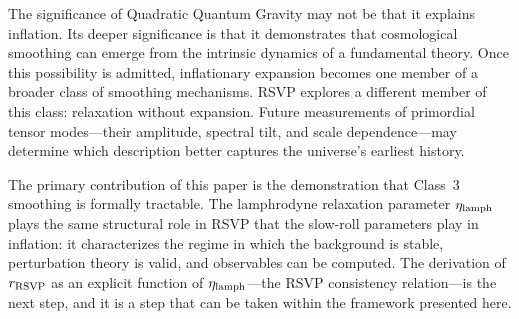 \documentclass[12pt, a4paper]{article}
\newcommand{\etalamph}{\eta_{\rm lamph}}
\newcommand{\rRSVP}{r_{\rm RSVP}}
\begin{document}
The significance of Quadratic Quantum Gravity may not be that it explains
inflation. Its deeper significance is that it demonstrates that cosmological
smoothing can emerge from the intrinsic dynamics of a fundamental theory. Once
this possibility is admitted, inflationary expansion becomes one member of a
broader class of smoothing mechanisms. RSVP explores a different member of this
class: relaxation without expansion. Future measurements of primordial tensor
modes---their amplitude, spectral tilt, and scale dependence---may determine which
description better captures the universe's earliest history.

The primary contribution of this paper is the demonstration that Class~3 smoothing
is formally tractable. The lamphrodyne relaxation parameter $\etalamph$ plays the
same structural role in RSVP that the slow-roll parameters play in inflation: it
characterizes the regime in which the background is stable, perturbation theory is
valid, and observables can be computed. The derivation of $\rRSVP$ as an explicit
function of $\etalamph$---the RSVP consistency relation---is the next step, and it
is a step that can be taken within the framework presented here.
\end{document}
